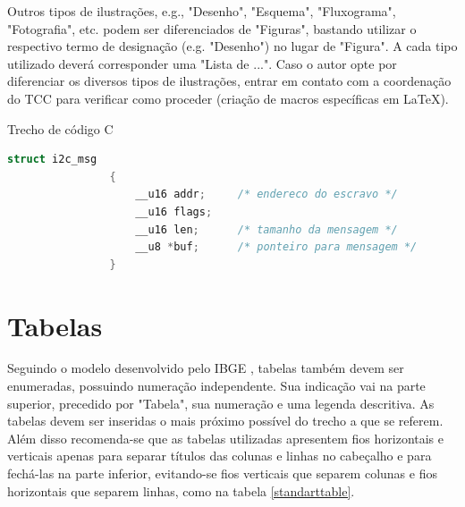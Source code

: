 \documentclass[repeatfields,xlists,xpacks,oneside,yearsonly]{ufrgscca}
\begin{document}
\begin{appendix}
\begin{figure}[htbp]
{\begin{center}
{\begin{circuitikz}[american, scale=0.8]
                        \end{circuitikz}
                    }
                \end{center}
            }

            {}
        \end{figure}

        Outros tipos de ilustrações, e.g.,   "Desenho", "Esquema", "Fluxograma", "Fotografia", etc. podem ser diferenciados de "Figuras", bastando utilizar o respectivo termo de designação (e.g. "Desenho") no lugar de "Figura". A cada tipo utilizado deverá corresponder uma "Lista de ...". Caso o autor opte por diferenciar os diversos tipos de ilustrações, entrar em contato com a coordenação do TCC para verificar como proceder (criação de macros específicas em \LaTeX).





        \begin{codelist}[htbp]
            \caption{Trecho de código C}
            \label{code01}
            \begin{lstlisting}[language=C]
                struct i2c_msg
                {
                    __u16 addr;     /* endereco do escravo */
                    __u16 flags;
                    __u16 len;      /* tamanho da mensagem */
                    __u8 *buf;      /* ponteiro para mensagem */
                }
            \end{lstlisting}
            {}
        \end{codelist}



        \section{Tabelas}

        Seguindo o modelo desenvolvido pelo IBGE \cite{IBGE:tabular-1993}, tabelas também devem ser enumeradas, possuindo numeração independente. Sua
        indicação vai na parte superior, precedido por "Tabela", sua numeração e uma
        legenda descritiva. As tabelas devem ser inseridas o
        mais próximo possível do trecho a que se referem.
        Além disso recomenda-se que as tabelas utilizadas apresentem fios
        horizontais e verticais apenas para separar títulos das colunas e linhas no
        cabeçalho e para fechá-las na parte inferior, evitando-se fios verticais que
        separem colunas e fios horizontais que separem linhas, como na tabela \ref{standarttable}.


\end{appendix}
\end{document}
